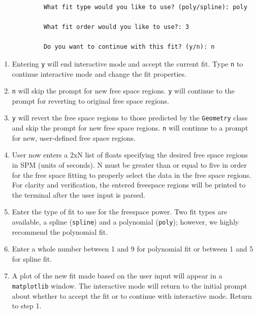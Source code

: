 \documentclass[titlepage, 12pt]{article}
\begin{document}
\begin{appendix}
\begin{lstlisting}
            What fit type would you like to use? (poly/spline): poly

            What fit order would you like to use?: 3

            Do you want to continue with this fit? (y/n): n
	    \end{lstlisting}
        \begin{enumerate}
            \item Entering \texttt{y} will end interactive mode and accept
                  the current fit. Type \texttt{n} to continue interactive mode
                  and change the fit properties.
            \item \texttt{n} will skip the prompt for new free space regions.
                  \texttt{y} will continue to the prompt for reverting to
                  original free space regions.
            \item \texttt{y} will revert the free space regions to those
                  predicted by the \texttt{Geometry} class and skip the prompt
                  for new free space regions. \texttt{n} will continue to a
                  prompt for new, user-defined free space regions.
            \item User now enters a 2xN list of floats specifying the desired
                  free space regions in SPM (units of seconds). N must be
                  greater than or equal to five in order for the free space
                  fitting to properly select the data in the free space regions.
                  For clarity and verification, the entered freespace regions
                  will be printed to the terminal after the user input is parsed.
            \item Enter the type of fit to use for the freespace power.
                  Two fit types are available, a spline (\texttt{spline}) and a
                  polynomial (\texttt{poly}); however, we highly recommend the
                  polynomial fit.
            \item Enter a whole number between 1 and 9 for polynomial
                  fit or between 1 and 5 for spline fit.
            \item A plot of the new fit made based on the user input will
                  appear in a \texttt{matplotlib} window. The interactive mode
                  will return to the initial prompt about whether to accept the
                  fit or to continue with interactive mode. Return to step 1.
        \end{enumerate}
    \end{appendix}
    \clearpage
    
    \printglossary[type=\acronymtype]
    \clearpage
    \printglossary[style=longpara]
    
\end{document}
